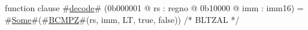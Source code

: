 function clause #\hyperref[zdecode]{decode}# (0b000001 @ rs : regno @ 0b10000 @ imm : imm16) =
  #\hyperref[zSome]{Some}#(#\hyperref[zBCMPZ]{BCMPZ}#(rs, imm, LT, true, false))  /* BLTZAL */
